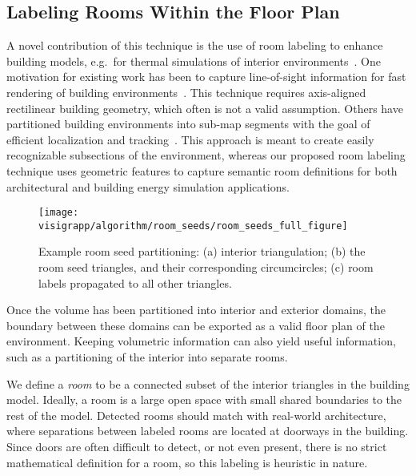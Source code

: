 \documentclass[12pt,onecolumn,oneside]{book}
\begin{document}
\subsection{Labeling Rooms Within the Floor Plan}
\label{ssec:room_label}

A novel contribution of this technique is the use of room labeling to enhance building models, e.g.\ for thermal simulations of interior environments~\cite{Turner14,EnergyPlus}.  One motivation for existing work has been to capture line-of-sight information for fast rendering of building environments~\cite{WalkthroughRendering}.  This technique requires axis-aligned rectilinear building geometry, which often is not a valid assumption.  Others have partitioned building environments into sub-map segments with the goal of efficient localization and tracking~\cite{SpectralClustering}.  This approach is meant to create easily recognizable subsections of the environment, whereas our proposed room labeling technique uses geometric features to capture semantic room definitions for both architectural and building energy simulation applications.

\begin{figure}[t]
  \centering
  \texttt{[image: visigrapp/algorithm/room\_seeds/room\_seeds\_full\_figure]}
  \caption[Example room seed partitioning.]{Example room seed partitioning: (a) interior triangulation; (b) the room seed triangles, and their corresponding circumcircles; (c) room labels propagated to all other triangles.}
  \label{fig:roomlabeling}
\end{figure}

Once the volume has been partitioned into interior and exterior domains, the boundary between these domains can be exported as a valid floor plan of the environment.  Keeping volumetric information can also yield useful information, such as a partitioning of the interior into separate rooms.

We define a {\it room} to be a connected subset of the interior triangles in the building model.  Ideally, a room is a large open space with small shared boundaries to the rest of the model.  Detected rooms should match with real-world architecture, where separations between labeled rooms are located at doorways in the building.  Since doors are often difficult to detect, or not even present, there is no strict mathematical definition for a room, so this labeling is heuristic in nature.
\end{document}
